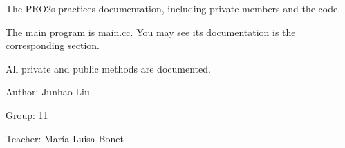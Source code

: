 The PRO2\textquotesingle{}s practice\textquotesingle{}s documentation, including private members and the code.

The main program is main.\+cc. You may see its documentation is the corresponding section.

All private and public methods are documented.


\begin{DoxyItemize}
\item Author\+: Junhao Liu
\item Group\+: 11
\item Teacher\+: María Luisa Bonet 
\end{DoxyItemize}